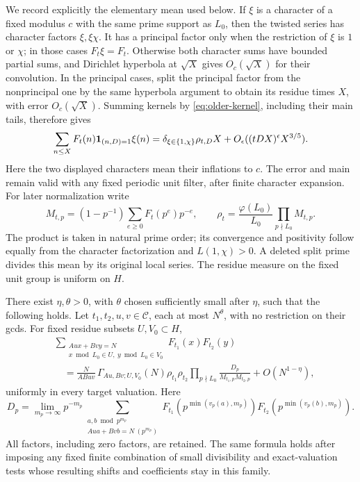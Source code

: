 We record explicitly the elementary mean used below.  If
\(\xi\) is a character of a fixed modulus \(c\) with the same prime
support as \(L_0\), then the twisted series has character factors
\(\xi,\xi\chi\).
It has a principal factor only when the restriction of \(\xi\)
is \(1\) or \(\chi\); in those cases \(F_t\xi=F_t\).
Otherwise both character sums have bounded partial sums, and
Dirichlet hyperbola at \(\sqrt X\) gives \(O_c(\sqrt X)\) for
their convolution.
In the principal cases, split the principal factor from the
nonprincipal one by the same hyperbola argument to obtain its residue
times \(X\), with error \(O_c(\sqrt X)\).
Summing kernels by \eqref{eq:older-kernel}, including their main tails,
therefore gives
\begin{equation}\label{eq:older-mean}
 \sum_{n\le X}F_t(n)\mathbf 1_{(n,D)=1}\xi(n)
 =\delta_{\xi\in\{1,\chi\}}\rho_{t,D}X
                         +O_\epsilon((tDX)^\epsilon X^{3/5}).
\end{equation}
Here the two displayed characters mean their inflations to \(c\).
The error and main remain valid with any fixed periodic unit filter,
after finite character expansion.
For later normalization write
\[
 M_{t,p}=(1-p^{-1})\sum_{e\ge0}F_t(p^e)p^{-e},\qquad
 \rho_t=\frac{\varphi(L_0)}{L_0}\prod_{p\nmid L_0}M_{t,p}.
\]
The product is taken in natural prime order; its convergence and
positivity follow equally from the character factorization and
\(L(1,\chi)>0\).  A deleted split prime divides this mean by its
original local series.  The residue measure on the fixed unit
group is uniform on \(H\).

\begin{proposition}\label{prop:older-weighted}
There exist \(\eta,\theta>0\), with \(\theta\) chosen sufficiently
small after \(\eta\), such that the following holds.
Let \(t_1,t_2,u,v\in\mathcal C\), each at most \(N^\theta\), with
no restriction on their gcds.  For fixed residue subsets \(U,V_0\subset H\),
\begin{align*}
 &\sum_{\substack{Au x+Bv y=N\\x\bmod L_0\in U,\ y\bmod L_0\in V_0}}
                      F_{t_1}(x)F_{t_2}(y)\\
 &\quad=\frac{N}{ABuv}\,
       \Gamma_{Au,Bv;U,V_0}(N)\rho_{t_1}\rho_{t_2}
       \prod_{p\nmid L_0}\frac{D_p}{M_{t_1,p}M_{t_2,p}}
                         +O(N^{1-\eta}),
\end{align*}
uniformly in every target valuation.  Here
\[
 D_p=\lim_{m_p\to\infty}p^{-m_p}
 \sum_{\substack{a,b\bmod p^{m_p}\\Au a+Bv b=N\ (p^{m_p})}}
       F_{t_1}(p^{\min(v_p(a),m_p)})
       F_{t_2}(p^{\min(v_p(b),m_p)}).
\]
All factors, including zero factors, are retained.
The same formula holds after imposing any fixed finite combination
of small divisibility and exact-valuation tests whose resulting
shifts and coefficients stay in this family.
\end{proposition}

